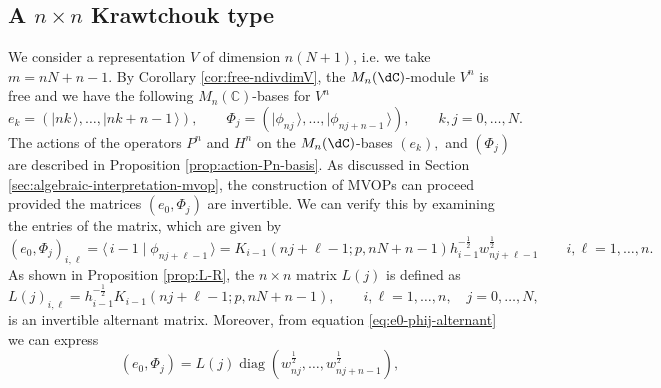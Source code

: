 \documentclass[a4paper,reqno]{amsart}
\DeclareMathOperator{\diag}{diag}
\theoremstyle{definition}
\numberwithin{equation}{section}
\newcommand{\bra}[1]{\langle\,{#1}}
\newcommand{\ket}[1]{\mid{#1}\,\rangle}
\begin{document}
\subsection{A $n\times n$ Krawtchouk type}
\label{sec:nxn-example-krawtchouk}
We consider a representation $V$ of dimension $n(N+1)$, i.e. we take $m=nN+n-1$. By Corollary \ref{cor:free-ndivdimV}, the $M_n(\dC)$-module $V^n$ is free and we have the following $M_n(\mathbb{C})$-bases for $V^n$
\begin{equation}
    e_k=(\ket{nk},\ldots,\ket{nk+n-1}), \qquad \Phi_j=(\ket{\phi_{nj}}, \ldots, \ket{\phi_{nj+n-1}}), \qquad k,j=0,\ldots,N.
\end{equation}
The actions of the operators $P^n$ and $H^n$ on the $M_n(\dC)$-bases $(e_k),$ and $(\Phi_j)$ are described in Proposition \ref{prop:action-Pn-basis}. As discussed in Section \ref{sec:algebraic-interpretation-mvop}, the construction of MVOPs can proceed provided the matrices $(e_0,\Phi_j)$ are invertible. We can verify this by examining the entries of the matrix, which are given by
\begin{equation}
\label{eq:e0-phij-alternant}
(e_0,\Phi_j)_{i,\ell}=\bra{i-1}\ket{\phi_{nj+\ell-1}} =K_{i-1}(nj+\ell-1;p,nN+n-1)h_{i-1}^{-\frac12}w^\frac12_{nj+\ell-1} \qquad i,\ell=1,\ldots, n.
\end{equation}
As shown in Proposition \ref{prop:L-R}, the $n\times n$ matrix $L(j)$ is defined as
\begin{equation}
\label{eq:alternant-krawtchouk}
L(j)_{i,\ell}=h_{i-1}^{-\frac12}K_{i-1}(nj+\ell-1;p,nN+n-1), \qquad i,\ell=1,\ldots, n, \quad j=0,\ldots,N,
\end{equation}
is an invertible alternant matrix. 
Moreover, from equation \eqref{eq:e0-phij-alternant} we can express
\begin{equation}
    (e_0,\Phi_j)=L(j)\diag(w^\frac12_{nj} ,\ldots,w^\frac12_{nj+n-1}),
\end{equation}
\end{document}
